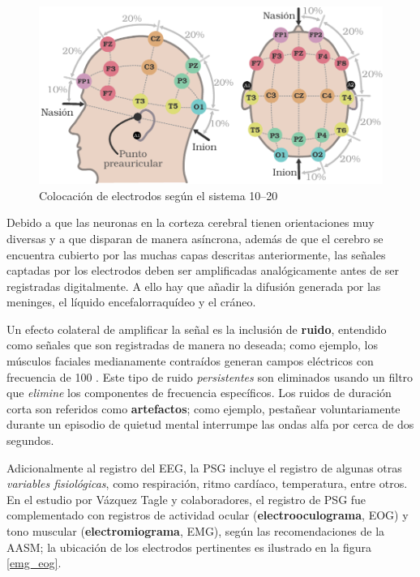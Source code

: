 \begin{figure}
\centering
\includegraphics[width=\linewidth]{./img_diagramas/cabeza_proporcionada_color_v4.pdf} 
\caption{Colocación de electrodos según el sistema 10--20}
\label{img1020}
\end{figure}

Debido a que las neuronas en la corteza cerebral tienen orientaciones muy diversas y a que disparan 
de manera asíncrona, además de que el cerebro se encuentra cubierto por las muchas capas descritas
anteriormente, las señales captadas por los electrodos deben ser amplificadas analógicamente antes 
de ser registradas digitalmente.
%
A ello hay que añadir la difusión generada por las meninges, el líquido encefalorraquídeo y el 
cráneo.

Un efecto colateral de amplificar la señal es la inclusión de \textbf{ruido}, entendido como 
señales que son registradas de manera no deseada; como ejemplo, los músculos faciales medianamente 
contraídos generan campos eléctricos con frecuencia de 100 \hz.
%
Este tipo de ruido \textit{persistentes} son eliminados usando un filtro que \textit{elimine} los 
componentes de frecuencia específicos.
%
Los ruidos de duración corta son referidos como \textbf{artefactos}; como ejemplo, pestañear 
voluntariamente durante un episodio de quietud mental interrumpe las ondas alfa por cerca de dos 
segundos. 

Adicionalmente al registro del EEG, la PSG incluye el registro de algunas otras \textit{variables 
fisiológicas}, como respiración, ritmo cardíaco, temperatura, entre otros. 
%
En el estudio por Vázquez Tagle y colaboradores, el registro de PSG fue complementado con registros 
de actividad ocular (\textbf{electrooculograma}, EOG) y tono muscular (\textbf{electromiograma}, 
EMG), según las recomendaciones de la AASM; la ubicación de los electrodos pertinentes es ilustrado 
en la figura \ref{emg_eog}.

